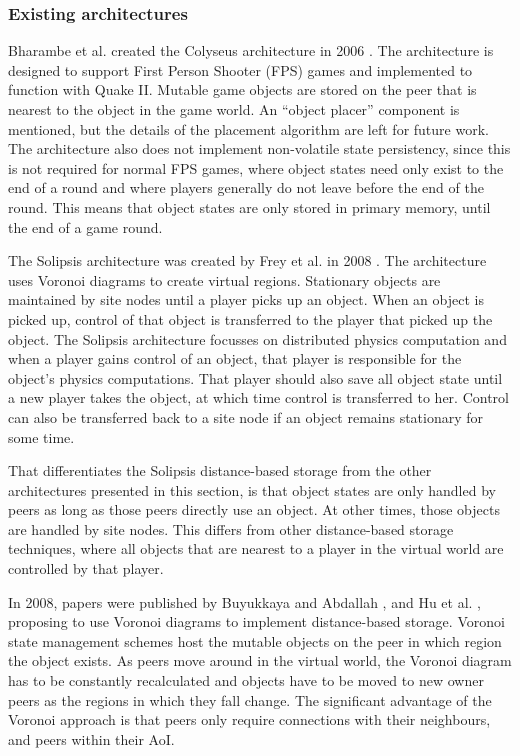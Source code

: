 \documentclass[10pt,a4paper,journal,cspaper,compsoc]{IEEEtran}
\begin{document}
\subsubsection{Existing architectures}
\label{distance_based_existing_archs}

Bharambe et al. created the Colyseus architecture in 2006 \cite{colyseus_distance_based}. The architecture is designed to support First Person
Shooter (FPS) games and implemented to function with Quake II. Mutable game objects are stored on the peer that is nearest to the object in the game
world. An ``object placer'' component is mentioned, but the details of the placement algorithm are left for future work. The architecture also does
not implement non-volatile state persistency, since this is not required for normal FPS games, where object states need only exist to the end of a
round and where players generally do not leave before the end of the round. This means that object states are only stored in primary memory, until
the end of a game round.

The Solipsis architecture was created by Frey et al. in 2008 \cite{solipsis}. The architecture uses Voronoi diagrams to create virtual regions.
Stationary objects are maintained by site nodes until a player picks up an object. When an object is picked up, control of that object is transferred
to the player that picked up the object. The Solipsis architecture focusses on distributed physics computation and when a player gains control of an
object, that player is responsible for the object's physics computations. That player should also save all object state until a new player takes the
object, at which time control is transferred to her. Control can also be transferred back to a site node if an object remains stationary for some
time.

That differentiates the Solipsis distance-based storage from the other architectures presented in this section, is that object states are only
handled by peers as long as those peers directly use an object. At other times, those objects are handled by site nodes. This differs from other
distance-based storage techniques, where all objects that are nearest to a player in the virtual world are controlled by that player.

In 2008, papers were published by Buyukkaya and Abdallah \cite{Buyukkaya_voronoi_state_management}, and Hu et al. \cite{Hu_voronoi_IM}, proposing to
use Voronoi diagrams \cite{voronoi_diagrams_survey} to implement distance-based storage. Voronoi state management schemes host the mutable objects on
the peer in which region the object exists. As peers move around in the virtual world, the Voronoi diagram has to be constantly recalculated and
objects have to be moved to new owner peers as the regions in which they fall change. The significant advantage of the Voronoi approach is that peers
only require connections with their neighbours, and peers within their AoI.
\end{document}
